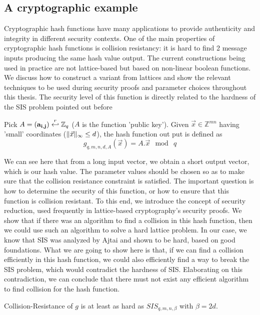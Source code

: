 \subsection{A cryptographic example}
\label{sec:ajtaiHash}
Cryptographic hash functions have many applications to
provide authenticity and integrity in different security contexts. One of the main properties of cryptographic
hash functions is collision resistancy: it is hard to find 2 message inputs
producing the same hash value output. The current constructions being used in practice
are not lattice-based but based on non-linear boolean functions. We discuss how
to construct a variant from lattices and show the relevant techniques
to be used during security proofs and parameter choices throughout this
thesis. The security level of this function is directly related to the hardness of
the SIS problem pointed out before
\begin{definition}
  Pick $A=(\mathbf{a_{i,j}}) \stackrel{r}{\hookleftarrow} \mathbb{Z}_q$ ($A$ is the function
  'public key'). Given $\vec{x} \in \mathbb{Z}^{mn}$ having 'small' coordinates
  ($\Vert \vec{x} \Vert_{\infty} \leq d$), the hash function out put is defined as
  \[
    g_{q,m,n,d,A}(\vec{x}) = A . \vec{x} \mod \ q
  \]
  \label{def:Ajtai's Hash Function}
\end{definition}
We can see here that from a long input vector, we obtain a short output vector, which is
our hash value. The parameter values should be chosen so as to make sure that the collision resistance constraint is
satisfied. The important question is how to determine the security of this
function, or how to ensure that this function is collision resistant. To this end, we
introduce the concept of security reduction, used frequently in
lattice-based cryptography's security proofs. We show that if there
was an algorithm to find a collision in this hash function, then we could use
such an algorithm to solve a hard lattice problem. In our case, we know that SIS
was analyzed by Ajtai and shown to be hard, based on good foundations. What we
are going to show here is that, if we can find a collision efficiently in this hash
function, we could also efficiently find a way to break the SIS problem, which
would contradict the hardness of SIS. Elaborating on this contradiction, we can
conclude that there must not exist any efficient algorithm to find collision for
the hash function.
\begin{theorem}
  Collision-Resistance of $g$ is at least as hard as $SIS_{q,m,n,\beta}$ with
  $\beta = 2d$.
  \label{the:ajtai hash}
\end{theorem}
